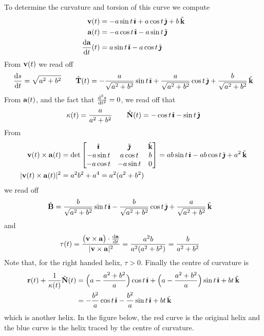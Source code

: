 \begin{eg}
To determine the curvature and torsion of this curve we compute
\begin{align*}
\vv(t)&= -a\sin t\,\hi +a\cos t\,\hj + b\,\hk  \\
\va(t)&= -a\cos t\,\hi -a\sin t\,\hj \\
\diff{\va}{t}(t)&= a\sin t\,\hi -a\cos t\,\hj
\end{align*}
From $\mathbf{v}(t)$ we read off
\begin{align*}
\diff{s}{t}=\sqrt{a^2+b^2}\qquad
\hat\vT(t)= -\frac{a}{\sqrt{a^2+b^2}}\sin t\,\hi
           +\frac{a}{\sqrt{a^2+b^2}} \cos t\,\hj
           +\frac{b}{\sqrt{a^2+b^2}}\,\hk
\end{align*}
From $\mathbf{a}(t)$, and the fact that $\difftwo{s}{t}=0$, we read off that
\begin{align*}
\kappa(t)=\frac{a}{a^2+b^2}\qquad
\hat{\mathbf{N}}(t) = -\cos t\,\hat{\pmb{\imath}}-\sin t\,\hat{\pmb{\jmath}}
\end{align*}
From
\begin{align*}
\mathbf{v}(t)\times\mathbf{a}(t)  &= \det\left[
                \begin{matrix}  \hat{\pmb{\imath}}   & \hat{\pmb{\jmath}}     & \hat{\mathbf{k}} \\
                             -a\sin t & a\cos t &  b \\
                             -a\cos t &-a\sin t & 0\end{matrix} \right] 
         = ab\sin t\,\hat{\pmb{\imath}} -ab\cos t\,\hat{\pmb{\jmath}} +a^2\,\hat{\mathbf{k}} \\
|\mathbf{v}(t)\times\mathbf{a}(t)|^2 &=a^2b^2+a^4 = a^2(a^2+b^2)
\end{align*}
we read off
\begin{align*}
\hat{\mathbf{B}} & = \frac{b}{\sqrt{a^2+b^2}}\sin t\,\hat{\pmb{\imath}}
           -\frac{b}{\sqrt{a^2+b^2}} \cos t\,\hat{\pmb{\jmath}}
           +\frac{a}{\sqrt{a^2+b^2}}\,\hat{\mathbf{k}}
\end{align*}
and
\begin{align*}
\tau(t) & = \frac{\big(\vv\times\va\big)\cdot \diff{\va}{t} }{|\vv\times\va|^2}
=\frac{a^2b}{a^2(a^2+b^2)}
=\frac{b}{a^2+b^2}
\end{align*}
Note that, for the right handed helix, $\tau>0$. Finally the centre of 
curvature is
\begin{align*}
\mathbf{r}(t) +\frac{1}{\kappa(t)}\hat{\mathbf{N}}(t)
&=\Big(a-\frac{a^2+b^2}{a}\Big)\cos t\,\hat{\pmb{\imath}}
 +\Big(a-\frac{a^2+b^2}{a}\Big)\sin t\,\hat{\pmb{\imath}}
 +bt\,\hat{\mathbf{k}} \\
&=-\frac{b^2}{a}\cos t\,\hat{\pmb{\imath}}
  -\frac{b^2}{a}\sin t\,\hat{\pmb{\imath}}
 +bt\,\hat{\mathbf{k}} 
\end{align*}
which is another helix. In the figure below, the red curve is the original
helix and the blue curve is the helix traced by the centre of curvature.

\end{eg}
